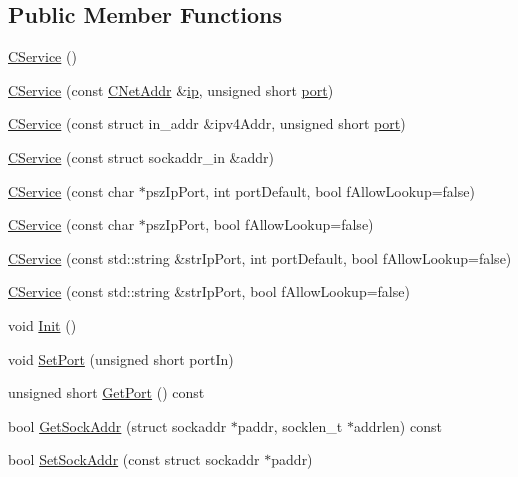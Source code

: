 \subsection*{Public Member Functions}
\begin{DoxyCompactItemize}
\item 
\hyperlink{class_c_service_a3003da1c50f2135123ebb3109340b9b2}{C\+Service} ()
\item 
\hyperlink{class_c_service_a43a0d18387ce3837d48020da47a1087c}{C\+Service} (const \hyperlink{class_c_net_addr}{C\+Net\+Addr} \&\hyperlink{class_c_net_addr_acff7ce68f33f8dfbfe6d79d80928d417}{ip}, unsigned short \hyperlink{class_c_service_aef17734203dc2125cbdf4d23e50be410}{port})
\item 
\hyperlink{class_c_service_a1fcc14e589f6d3e92b43707a5f71368f}{C\+Service} (const struct in\+\_\+addr \&ipv4\+Addr, unsigned short \hyperlink{class_c_service_aef17734203dc2125cbdf4d23e50be410}{port})
\item 
\hyperlink{class_c_service_aa54fd9204530445647cd3d45056881e9}{C\+Service} (const struct sockaddr\+\_\+in \&addr)
\item 
\hyperlink{class_c_service_a75b2a3cfa16642b0fcd74382203a9fdc}{C\+Service} (const char $\ast$psz\+Ip\+Port, int port\+Default, bool f\+Allow\+Lookup=false)
\item 
\hyperlink{class_c_service_ab8f5f4ae4e99a4edad8ba48642e36137}{C\+Service} (const char $\ast$psz\+Ip\+Port, bool f\+Allow\+Lookup=false)
\item 
\hyperlink{class_c_service_a677f74b3520148f3e47a19bb9986922b}{C\+Service} (const std\+::string \&str\+Ip\+Port, int port\+Default, bool f\+Allow\+Lookup=false)
\item 
\hyperlink{class_c_service_a19a7a713dd9a30b2f78260e61d9a2604}{C\+Service} (const std\+::string \&str\+Ip\+Port, bool f\+Allow\+Lookup=false)
\item 
void \hyperlink{class_c_service_aee07d7f18e672f16d26359e3cab779ff}{Init} ()
\item 
void \hyperlink{class_c_service_a3dedc3f12aa21bdbf1068b054d3e3d39}{Set\+Port} (unsigned short port\+In)
\item 
unsigned short \hyperlink{class_c_service_a49df6ecaf59be814632c4d7755f26637}{Get\+Port} () const 
\item 
bool \hyperlink{class_c_service_ab0f791c174511056236119cc1580faeb}{Get\+Sock\+Addr} (struct sockaddr $\ast$paddr, socklen\+\_\+t $\ast$addrlen) const 
\item 
bool \hyperlink{class_c_service_a77782219f5d85f326b4c089cb2636e6f}{Set\+Sock\+Addr} (const struct sockaddr $\ast$paddr)

\end{DoxyCompactItemize}

